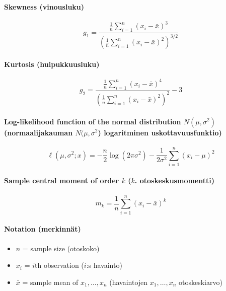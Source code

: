 \documentclass[12pt,a4]{article}
\begin{document}
\pagestyle{fancy}

\paragraph{Skewness (vinousluku)}
\[
    g_1 = \frac{\frac1n \sum_{i=1}^n (x_i - \bar x)^3}{\left(\frac1n \sum_{i=1}^n(x_i - \bar x)^2\right)^{3/2}}
\]
\paragraph{Kurtosis (huipukkuusluku)}
\[
    g_2 = \frac{\frac1n \sum_{i=1}^n (x_i - \bar x)^4}{\left(\frac1n \sum_{i=1}^n(x_i - \bar x)^2\right)^2} - 3
\]
\paragraph{Log-likelihood function of the normal distribution $N(\mu, \sigma^2)$ \\ (normaalijakauman $N(\mu, \sigma^2$) logaritminen uskottavuusfunktio)}
\[
    \ell(\mu, \sigma^2;x) = -\frac{n}2\log(2\pi\sigma^2) - \frac1{2\sigma^2}\sum_{i=1}^n (x_i-\mu)^2
\]
\paragraph{Sample central moment of order $k$ ($k$. otoskeskusmomentti)}
\[
    m_k = \frac1n \sum_{i=1}^n (x_i - \bar x)^k
\]
\paragraph{Notation (merkinnät)}
\begin{itemize}
    \item $n$ = sample size (otoskoko)
    \item $x_i$ = $i$th observation ($i$:s havainto)
    \item $\bar x$ = sample mean of $x_1, \ldots, x_n$ (havaintojen $x_1, \ldots, x_n$ otoskeskiarvo)
\end{itemize}
\end{document}
